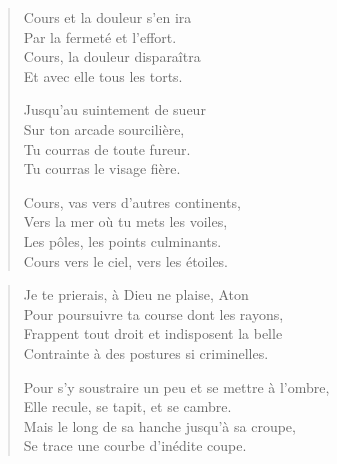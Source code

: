 \begin{verse}\quatrain
  Cours et la douleur s’en ira\\ 
  Par la fermeté et l’effort.\\ 
  Cours, la douleur disparaîtra\\ 
  Et avec elle tous les torts.  %

  Jusqu’au suintement de sueur\\ 
  Sur ton arcade sourcilière,\\ 
  Tu courras de toute fureur.\\ 
  Tu courras le visage fière.  %

  Cours, vas vers d’autres continents,\\ 
  Vers la mer où tu mets les voiles,\\ 
  Les pôles, les points culminants.\\ 
  Cours vers le ciel, vers les étoiles.  %
\end{verse}

\begin{verse}\quatrain
  Je te prierais, à Dieu ne plaise, Aton%
  \\ 
  Pour poursuivre ta course dont les rayons,\\ 
  Frappent tout droit et indisposent la belle\\ 
  Contrainte à des postures si criminelles.  %

  Pour s’y soustraire un peu et se mettre à l’ombre,\\ 
  Elle recule, se tapit, et se cambre.\\ 
  Mais le long de sa hanche jusqu’à sa croupe,\\ 
  Se trace une courbe d’inédite coupe.  %
\end{verse}

